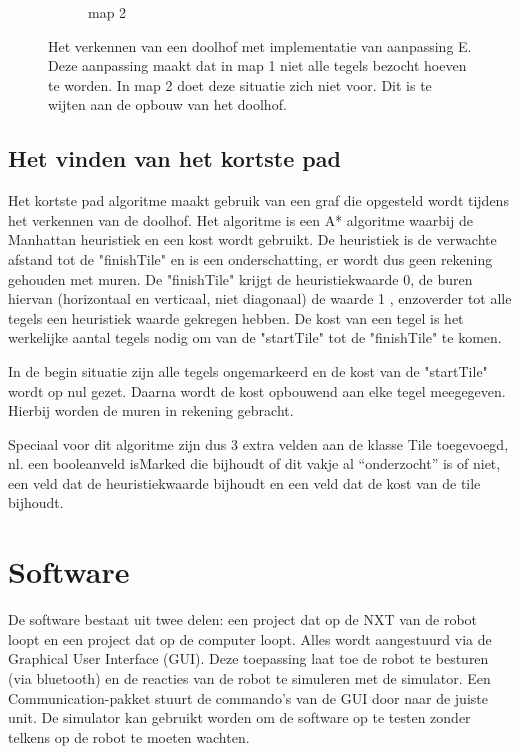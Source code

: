 \documentclass[tt3]{penoverslag}
\begin{document}
\begin{figure}
\begin{subfigure}[h]{0.36\textwidth}
                \caption{map 2}
        \end{subfigure}
 \caption{Het verkennen van een doolhof met implementatie van aanpassing E. Deze aanpassing maakt dat in map 1 niet alle tegels bezocht hoeven te worden. In map 2 doet deze situatie zich niet voor. Dit is te wijten aan de opbouw van het doolhof.}
\label{fig:resultVerkenE}
\end{figure}

\subsection{Het vinden van het kortste pad} %
\label{ssec:AlgoKortsteP}

Het kortste pad algoritme maakt gebruik van een graf die opgesteld wordt tijdens het verkennen van de doolhof. Het algoritme is een A* algoritme waarbij de Manhattan heuristiek en een kost wordt gebruikt.
De heuristiek is de verwachte afstand tot de "finishTile" en is een onderschatting, er wordt dus geen rekening gehouden met muren. De "finishTile" krijgt de heuristiekwaarde 0, de buren hiervan (horizontaal en verticaal, niet diagonaal) de waarde 1 , enzoverder tot alle tegels een heuristiek waarde gekregen hebben.
De kost van een tegel is het werkelijke aantal tegels nodig om van de "startTile" tot de "finishTile" te komen.

In de begin situatie zijn alle tegels ongemarkeerd en de kost van de "startTile" wordt op nul gezet. Daarna wordt de kost opbouwend aan elke tegel meegegeven. Hierbij worden de muren in rekening gebracht.

Speciaal voor dit algoritme zijn dus 3 extra velden aan de klasse Tile toegevoegd, nl. een booleanveld isMarked die bijhoudt of dit vakje al “onderzocht” is of niet, een veld dat de heuristiekwaarde bijhoudt en een veld dat de kost van de tile bijhoudt.


\section{Software} %
\label{sec:softw}
De software bestaat uit twee delen: een project dat op de NXT van de robot loopt en een project dat op de computer loopt. Alles wordt aangestuurd via de Graphical User Interface (GUI). Deze toepassing laat toe de robot te besturen (via bluetooth) en de reacties van de robot te simuleren met de simulator. Een Communication-pakket stuurt de commando's van de GUI door naar de juiste unit.
De simulator kan gebruikt worden om de software op te testen zonder telkens op de robot te moeten wachten.
\end{document}
